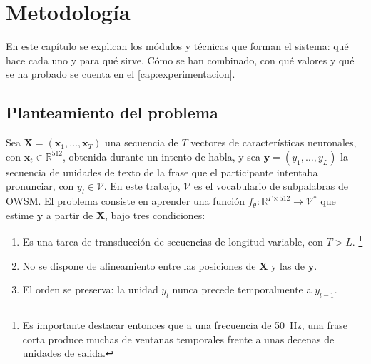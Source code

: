 
\chapter{Metodología}
\label{cap:metodologia}

En este capítulo se explican los módulos y técnicas que forman el sistema: qué hace cada uno y para qué sirve. Cómo se han combinado, con qué valores y qué se ha probado se cuenta en el \cref{cap:experimentacion}.

\section{Planteamiento del problema}
\label{sec:planteamiento-formal}

Sea $\mathbf{X} = (\mathbf{x}_1, \dots, \mathbf{x}_T)$ una secuencia de $T$ vectores de características neuronales, con $\mathbf{x}_t \in \mathbb{R}^{512}$, obtenida durante un intento de habla, y sea $\mathbf{y} = (y_1, \dots, y_L)$ la secuencia de unidades de texto de la frase que el participante intentaba pronunciar, con $y_l \in \mathcal{V}$. En este trabajo, $\mathcal{V}$ es el vocabulario de subpalabras de OWSM. El problema consiste en aprender una función $f_\theta: \mathbb{R}^{T \times 512} \rightarrow \mathcal{V}^{*}$ que estime $\mathbf{y}$ a partir de $\mathbf{X}$, bajo tres condiciones:

\begin{enumerate}[label=(\alph*), leftmargin=*]
  \item Es una tarea de transducción de secuencias de longitud variable, con $T > L$. \footnote{Es importante destacar entonces que a una frecuencia de \SI{50}{\hertz}, una frase corta produce muchas de ventanas temporales frente a unas decenas de unidades de salida.}
  \item No se dispone de alineamiento entre las posiciones de $\mathbf{X}$ y las de $\mathbf{y}$.
  \item El orden se preserva: la unidad $y_l$ nunca precede temporalmente a $y_{l-1}$.
\end{enumerate}

